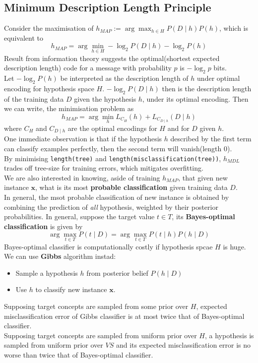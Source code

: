\documentclass[12pt]{article}
\theoremstyle{definition}
\begin{document}
\subsection{Minimum Description Length Principle}
Consider the maximisation of $h_{MAP}:=\arg\max_{h\in H} P(D\mid h)P(h)$, which is equivalent to 
\[
h_{MAP}=\arg\min_{h\in H} -\log_2 P(D\mid h)-\log_2P(h)
\]
Result from information theory suggests the optimal(shortest expected description length) code for a message with probability $p$ is $-\log_2 p$ bits.\\
Let $-\log_2P(h)$ be interpreted as the description length of $h$ under optimal encoding for hypothesis space $H$. $-\log_2P(D\mid h)$ then is the description length of the training data $D$ given the hypothesis $h$, under its optimal encoding. Then we can write, the minimisation problem as
\[
h_{MAP}=\arg\min_h L_{C_H}(h) + L_{C_{D\mid h}}(D\mid h)
\]
where $C_H$ and $C_{D\mid h}$ are the optimal encodings for $H$ and for $D$ given $h$.\\
One immediate observation is that if the hypothesis $h$ described by the first term can classify examples perfectly, then the second term will vanish(length 0).\\
By minimising \texttt{length(tree)} and \texttt{length(misclassification(tree))}, $h_{MDL}$ trades off tree-size for training errors, which mitigates overfitting.\\
We are also interested in knowing, aside of training $h_{MAP}$, that given new instance $\mathbf{x}$, what is its most \textbf{probable classification} given training data $D$.\\
In general, the msot probable classification of new instance is obtained by combining the prediction of \textit{all} hypothesis, weighted by their posterior probabilities. In general, suppose the target value $t\in T$, its \textbf{Bayes-optimal classification} is given by
\[
\arg\max_{t\in T}P(t\mid D) = \arg\max_{t\in T}P(t\mid h)P(h\mid D)
\]
Bayes-optimal classifier is computationally costly if hypothesis spcae $H$ is huge. We can use \textbf{Gibbs} algorithm instad:
\begin{itemize}
	\item Sample a hypothesis $h$ from posterior belief $P(h\mid D)$
	\item Use $h$ to classify new instance $\mathbf{x}$.
\end{itemize}
Supposing target concepts are sampled from some prior over $H$, expected misclassification error of Gibbs classifier is at most twice that of Bayes-optimal classifier.\\
Supposing target concepts are sampled from uniform prior over $H$, a hypothesis is sampled from uniform prior over $VS$ and its expected misclassification error is no worse than twice that of Bayes-optimal classifier.
\end{document}
